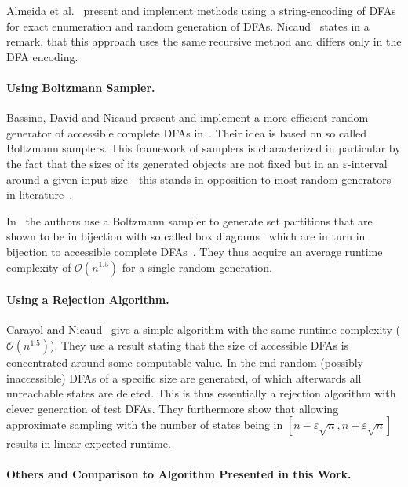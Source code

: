 Almeida et al.~\cite{AAA09, AMR09, RMA05} present and implement methods using a string-encoding of DFAs for exact enumeration and random generation of DFAs. Nicaud~\cite[p. 11]{Nic14} states in a remark, that this approach uses the same recursive method and differs only in the DFA encoding.

\paragraph*{Using Boltzmann Sampler.}

Bassino, David and Nicaud present and implement a more efficient random generator of accessible complete DFAs in~\cite{BDN07, BN07}. Their idea is based on so called Boltzmann samplers. This framework of samplers is characterized in particular by the fact that the sizes of its generated objects are not fixed but in an $\varepsilon$-interval around a given input size - this stands in opposition to most random generators in literature~\cite[p. 2]{DFL04}.

In~\cite{BN07} the authors use a Boltzmann sampler to generate set partitions that are shown to be in bijection with so called box diagrams~\cite[p. 8]{BN07} which are in turn in bijection to accessible complete DFAs~\cite[p. 4]{BN07}. They thus acquire an average runtime complexity of $\mathcal{O}(n^{1.5})$ for a single random generation.

\paragraph*{Using a Rejection Algorithm.}

Carayol and Nicaud~\cite{CN12} give a simple algorithm with the same runtime complexity ($\mathcal{O}(n^{1.5})$). They use a result stating that the size of accessible DFAs is concentrated around some computable value. In the end random (possibly inaccessible) DFAs of a specific size are generated, of which afterwards all unreachable states are deleted. This is thus essentially a rejection algorithm with clever generation of test DFAs. They furthermore show that allowing approximate sampling with the number of states being in $[n-\varepsilon\sqrt{n}, n+\varepsilon\sqrt{n}]$ results in linear expected runtime.

\paragraph*{Others and Comparison to Algorithm Presented in this Work.}

